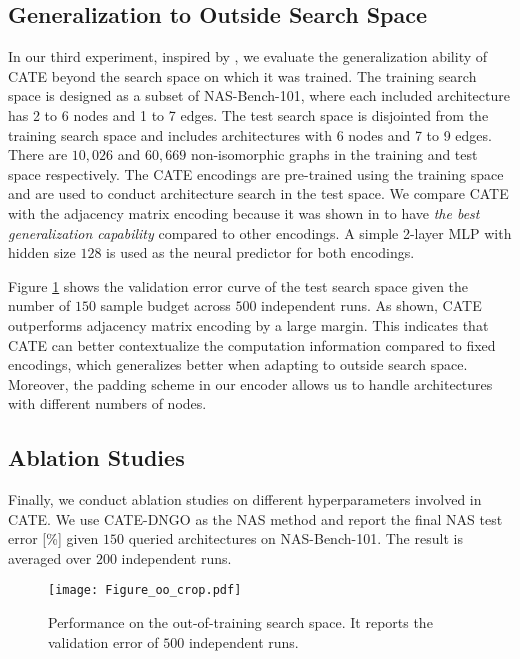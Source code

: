 \subsection{Generalization to Outside Search Space}
In our third experiment, inspired by \cite{white2020study}, we evaluate the generalization ability of CATE beyond the search space on which it was trained. The training search space is designed as a subset of NAS-Bench-101, where each included architecture has 2 to 6 nodes and 1 to 7 edges. The test search space is disjointed from the training search space and includes architectures with 6 nodes and 7 to 9 edges. There are $10,026$ and $60,669$ non-isomorphic graphs in the training and test space respectively. The CATE encodings are pre-trained using the training space and are used to conduct architecture search in the test space. We compare CATE with the adjacency matrix encoding because it was shown in \cite{white2020study} to have \emph{the best generalization capability} compared to other encodings. A simple 2-layer MLP with hidden size $128$ is used as the neural predictor for both encodings. 

Figure \ref{fig.oo} shows the validation error curve of the test search space given the number of $150$ sample budget across $500$ independent runs. As shown, CATE outperforms adjacency matrix encoding by a large margin.
This indicates that CATE can better contextualize the computation information compared to fixed encodings, which generalizes better when adapting to outside search space. Moreover, the padding scheme in our encoder allows us to handle architectures with different numbers of nodes.

\subsection{Ablation Studies}
\label{sec:ablation}
Finally, we conduct ablation studies on different hyperparameters involved in CATE. We use CATE-DNGO as the NAS method and report the final NAS test error [\%] given $150$ queried architectures on NAS-Bench-101. The result is averaged over $200$ independent runs.

\begin{figure}[t]
	\centering
	\texttt{[image: Figure\_oo\_crop.pdf]}
\caption{Performance on the out-of-training search space. It reports the validation error of $500$ independent runs.}
	\label{fig.oo}
\end{figure}

